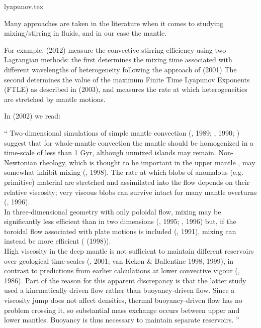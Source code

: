 \begin{flushright} {\tiny {\color{gray} lyapunov.tex}} \end{flushright}

Many approaches are taken in the literature when it comes 
to studying mixing/stirring in fluids, and in our case the mantle.

For example, \textcite{sato12} (2012) 
measure the convective stirring efficiency using two Lagrangian methods: 
the first determines the mixing time associated with
different wavelengths of heterogeneity following the approach of \textcite{feri01} (2001)
The second determines the value of
the maximum Finite Time Lyapunov Exponents (FTLE) as described in 
\textcite{fasa03} (2003), and measures the rate at
which heterogeneities are stretched by mantle motions.

In \textcite{taxi02} (2002) we read: 

\begin{displayquote}
{\color{darkgray}
``
Two-dimensional simulations of simple mantle convection (\textcite{chri89}, 1989; 
\textcite{ketu90}, 1990; \textcite{scha94}) suggest that for whole-mantle 
convection the mantle should be homogenized in a time-scale of less than 1 Gyr, although
unmixed islands may remain. Non-Newtonian rheology, which is thought to be 
important in the upper mantle \cite{kawu93}, may somewhat inhibit mixing (\textcite{tepy98}, 1998). 
The rate at which blobs of anomalous (e.g. primitive) material are stretched
and assimilated into the ﬂow depends on their relative viscosity; very viscous blobs
can survive intact for many mantle overturns (\textcite{mang96}, 1996).
\\
In three-dimensional geometry with only poloidal ﬂow, mixing may be signiﬁcantly
less efficient than in two dimensions (\textcite{schh95}, 1995; \textcite{schh96}, 1996) 
but, if the toroidal ﬂow associated with plate motions is 
included (\textcite{gaot91}, 1991), mixing can instead be more efficient 
(\textcite{feri98} (1998)).
\\
High viscosity in the deep mantle is not suﬃcient to maintain diﬀerent reservoirs
over geological time-scales (\textcite{feri01}, 2001; van Keken \& Ballentine 1998,
1999), in contrast to predictions from earlier calculations at lower convective vigour
(\textcite{guda86b}, 1986). Part of the reason for this apparent discrepancy is that
the latter study used a kinematically driven ﬂow rather than buoyancy-driven ﬂow.
Since a viscosity jump does not aﬀect densities, thermal buoyancy-driven ﬂow has no
problem crossing it, so substantial mass exchange occurs between upper and lower
mantles. Buoyancy is thus necessary to maintain separate reservoirs.
''
}
\end{displayquote}


